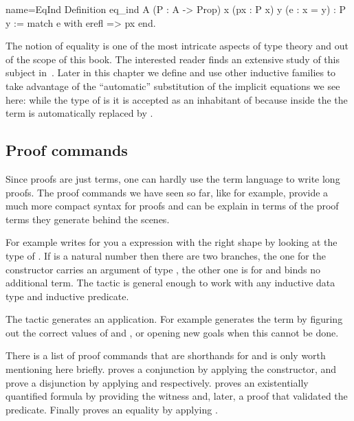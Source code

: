 \begin{coq}{name=EqInd}{}
Definition eq_ind A (P : A -> Prop) x (px : P x) y (e : x = y) : P y :=
  match e with erefl => px end.
\end{coq}

The notion of equality is one of the most intricate aspects of type
theory and out of the scope of this book.  The interested reader
finds an extensive study of this subject in~\cite{hott}.  Later in this
chapter we define and use other inductive families to take advantage
of the ``automatic'' substitution of the implicit equations we see here:
while the type of  is  it is accepted as an
inhabitant of  because inside the  the term 
is automatically replaced by .

\subsection{Proof commands}

Since proofs are just terms, one can hardly use the term language to
write long proofs.   The proof commands we have seen so far, like
 for example, provide a much more compact syntax for proofs and can be explain in terms of the proof terms they generate behind the scenes.

For example  writes for you a  expression with the right
shape by looking at the type of .  If  is a natural number then there
are two branches, the one for the  constructor carries an argument of type
, the other one is for  and binds no additional term.
The  tactic is general enough to work with any inductive data type
and inductive predicate.

The  tactic generates an application.  For example 
generates the term  by figuring out the correct values of
 and , or opening new goals when this cannot be done.

There is a list of proof commands that are shorthands for 
and is only worth mentioning here briefly.  proves a conjunction
by applying the  constructor,  and  prove a
disjunction by applying  and  respectively.
 proves an existentially quantified formula by providing
the witness  and, later, a proof that  validated the predicate.
Finally  proves an equality by applying .

